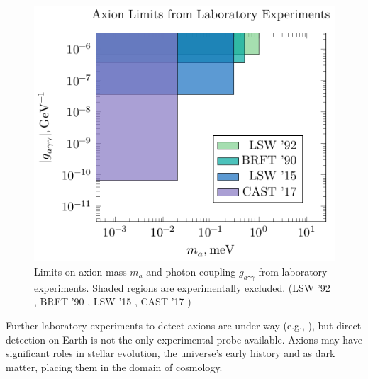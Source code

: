 \begin{figure}
	\centering
	\includegraphics{diagrams/lab-bounds.pdf}
	\caption{Limits on axion mass $m_a$ and photon coupling {}$g_{aγγ}$ from laboratory experiments. Shaded regions are experimentally excluded.
		(LSW '92 \cite{first-LSW-experiment},
		BRFT '90 \cite{axion_dichromism},
		LSW '15 \cite{best-LSW-experiment},
		CAST '17 \cite{CAST-helioscope_2017})
	}
\end{figure}

Further laboratory experiments to detect axions are under way (e.g., \cite{further-lab-experiments_2017}), but direct detection on Earth is not the only experimental probe available.
Axions may have significant roles in stellar evolution, the universe's early history and as dark matter, placing them in the domain of cosmology.